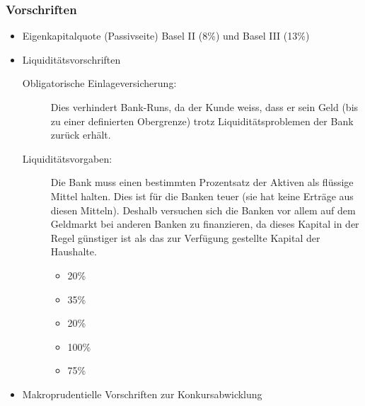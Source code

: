 \subsubsection{Vorschriften}
\begin{itemize}
	\item Eigenkapitalquote (Passivseite)
	\subitem Basel II (8\%) und Basel III (13\%)
	\item Liquiditätsvorschriften
	\begin{description}
		\item[Obligatorische Einlageversicherung:] Dies verhindert Bank-Runs, da der Kunde weiss, dass er sein Geld (bis zu einer definierten Obergrenze) trotz Liquiditätsproblemen der Bank zurück erhält.
		\item[Liquiditätsvorgaben:] Die Bank muss einen bestimmten Prozentsatz der Aktiven als flüssige Mittel halten. Dies ist für die Banken teuer (sie hat keine Erträge aus diesen Mitteln). Deshalb versuchen sich die Banken vor allem auf dem Geldmarkt bei anderen Banken zu finanzieren, da dieses Kapital in der Regel günstiger ist als das zur Verfügung gestellte Kapital der Haushalte.
		\begin{itemize}
			\item{} 20\%
			\item{} 35\%
			\item{} 20\%
			\item{} 100\%
			\item{} 75\%
		\end{itemize}
	\end{description}
	\item Makroprudentielle Vorschriften zur Konkursabwicklung
\end{itemize}

